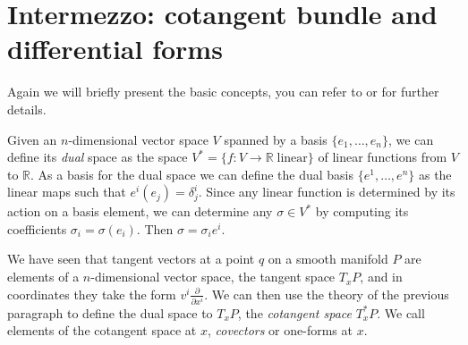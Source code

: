 \documentclass[english,fontsize=11pt,paper=b5]{scrbook}
\numberwithin{equation}{chapter}
\theoremstyle{definition}
\begin{document}
    \section{Intermezzo: cotangent bundle and differential forms}

    Again we will briefly present the basic concepts, you can refer to \cite{book:lee} or \cite[Chapters 5-7]{lectures:aom:seri} for further details.

    Given an $n$-dimensional vector space $V$ spanned by a basis $\{e_1, \ldots, e_n\}$, we can define its \emph{dual} space as the space $V^* = \{f : V \to \mathbb{R} \; \mbox{linear}\}$ of linear functions from $V$ to $\mathbb{R}$.
    As a basis for the dual space we can define the dual basis $\{e^1, \ldots, e^n\}$ as the linear maps such that $e^i(e_j) = \delta^i_j$. Since any linear function is determined by its action on a basis element, we can determine any $\sigma \in V^*$ by computing its coefficients $\sigma_i = \sigma(e_i)$. Then $\sigma = \sigma_i e^i$.

    We have seen that tangent vectors at a point $q$ on a smooth manifold $P$ are elements of a $n$-dimensional vector space, the tangent space $T_x P$, and in coordinates they take the form $v^i \frac{\partial}{\partial x^i}$.
    We can then use the theory of the previous paragraph to define the dual space to $T_x P$, the \emph{cotangent space} $T^*_x P$.
    We call elements of the cotangent space at $x$, \emph{covectors} or one-forms at $x$.
\end{document}
